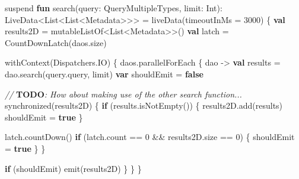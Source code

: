 \documentclass[
]{article}
\newenvironment{Shaded}{}{}
\newcommand{\AlertTok}[1]{\textcolor[rgb]{1.00,0.00,0.00}{\textbf{#1}}}
\newcommand{\CommentTok}[1]{\textcolor[rgb]{0.38,0.63,0.69}{\textit{#1}}}
\newcommand{\ControlFlowTok}[1]{\textcolor[rgb]{0.00,0.44,0.13}{\textbf{#1}}}
\newcommand{\DataTypeTok}[1]{\textcolor[rgb]{0.56,0.13,0.00}{#1}}
\newcommand{\DecValTok}[1]{\textcolor[rgb]{0.25,0.63,0.44}{#1}}
\newcommand{\FunctionTok}[1]{\textcolor[rgb]{0.02,0.16,0.49}{#1}}
\newcommand{\KeywordTok}[1]{\textcolor[rgb]{0.00,0.44,0.13}{\textbf{#1}}}
\newcommand{\NormalTok}[1]{#1}
\newcommand{\OperatorTok}[1]{\textcolor[rgb]{0.40,0.40,0.40}{#1}}
\newcommand{\VariableTok}[1]{\textcolor[rgb]{0.10,0.09,0.49}{#1}}
\begin{document}
\begin{Shaded}
\begin{Highlighting}[]
\NormalTok{suspend }\KeywordTok{fun} \FunctionTok{search}\OperatorTok{(}\VariableTok{query}\OperatorTok{:} \DataTypeTok{QueryMultipleTypes}\OperatorTok{,} \VariableTok{limit}\OperatorTok{:} \DataTypeTok{Int}\OperatorTok{):}
        \DataTypeTok{LiveData}\OperatorTok{<}\DataTypeTok{List}\OperatorTok{<}\DataTypeTok{List}\OperatorTok{<}\DataTypeTok{Metadata}\OperatorTok{>>>} \OperatorTok{=}\NormalTok{ liveData}\OperatorTok{(}\NormalTok{timeoutInMs }\OperatorTok{=} \DecValTok{3000}\OperatorTok{)} \OperatorTok{\{}
    \KeywordTok{val} \VariableTok{results2D} \OperatorTok{=}\NormalTok{ mutableListOf}\OperatorTok{<}\NormalTok{List}\OperatorTok{<}\NormalTok{Metadata}\OperatorTok{>>()}
    \KeywordTok{val} \VariableTok{latch} \OperatorTok{=}\NormalTok{ CountDownLatch}\OperatorTok{(}\NormalTok{daos}\OperatorTok{.}\NormalTok{size}\OperatorTok{)}

\NormalTok{    withContext}\OperatorTok{(}\NormalTok{Dispatchers}\OperatorTok{.}\NormalTok{IO}\OperatorTok{)} \OperatorTok{\{}
\NormalTok{        daos}\OperatorTok{.}\NormalTok{parallelForEach }\OperatorTok{\{}\NormalTok{ dao }\OperatorTok{{-}>}
            \KeywordTok{val} \VariableTok{results} \OperatorTok{=}\NormalTok{ dao}\OperatorTok{.}\NormalTok{search}\OperatorTok{(}\NormalTok{query}\OperatorTok{.}\NormalTok{query}\OperatorTok{,}\NormalTok{ limit}\OperatorTok{)}
            \KeywordTok{var} \VariableTok{shouldEmit} \OperatorTok{=} \KeywordTok{false}

            \CommentTok{// }\AlertTok{TODO}\CommentTok{: How about making use of the other search function...}
\NormalTok{            synchronized}\OperatorTok{(}\NormalTok{results2D}\OperatorTok{)} \OperatorTok{\{}
                \ControlFlowTok{if} \OperatorTok{(}\NormalTok{results}\OperatorTok{.}\NormalTok{isNotEmpty}\OperatorTok{())} \OperatorTok{\{}
\NormalTok{                    results2D}\OperatorTok{.}\NormalTok{add}\OperatorTok{(}\NormalTok{results}\OperatorTok{)}
\NormalTok{                    shouldEmit }\OperatorTok{=} \KeywordTok{true}
                \OperatorTok{\}}

\NormalTok{                latch}\OperatorTok{.}\NormalTok{countDown}\OperatorTok{()}
                \ControlFlowTok{if} \OperatorTok{(}\NormalTok{latch}\OperatorTok{.}\NormalTok{count }\OperatorTok{==} \DecValTok{0} \OperatorTok{\&\&}\NormalTok{ results2D}\OperatorTok{.}\NormalTok{size }\OperatorTok{==} \DecValTok{0}\OperatorTok{)} \OperatorTok{\{}
\NormalTok{                    shouldEmit }\OperatorTok{=} \KeywordTok{true}
                \OperatorTok{\}}
            \OperatorTok{\}}

            \ControlFlowTok{if} \OperatorTok{(}\NormalTok{shouldEmit}\OperatorTok{)}\NormalTok{ emit}\OperatorTok{(}\NormalTok{results2D}\OperatorTok{)}
        \OperatorTok{\}}
    \OperatorTok{\}}
\OperatorTok{\}}
\end{Highlighting}
\end{Shaded}
\end{document}
